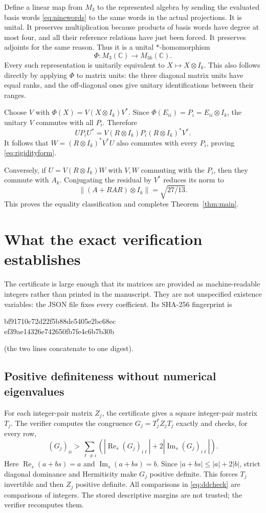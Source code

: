 \documentclass[11pt]{article}
\theoremstyle{definition}\newtheorem{definition}[theorem]{Definition}
\theoremstyle{remark}\newtheorem{remark}[theorem]{Remark}
\newcommand{\C}{\mathbb C}
\newcommand{\norm}[1]{\left\lVert#1\right\rVert}
\begin{document}
Define a linear map from $M_3$ to the represented algebra by sending the evaluated basis words \eqref{eq:ninewords} to the same words in the actual projections. It is unital. It preserves multiplication because products of basis words have degree at most four, and all their reference relations have just been forced. It preserves adjoints for the same reason. Thus it is a unital $*$-homomorphism
\[
 \Phi:M_3(\C)\longrightarrow M_{3k}(\C).
\]
Every such representation is unitarily equivalent to $X\mapsto X\otimes I_k$. This also follows directly by applying $\Phi$ to matrix units: the three diagonal matrix units have equal ranks, and the off-diagonal ones give unitary identifications between their ranges.

Choose $V$ with $\Phi(X)=V(X\otimes I_k)V^*$. Since $\Phi(E_{ii})=P_i=E_{ii}\otimes I_k$, the unitary $V$ commutes with all $P_i$. Therefore
\[
 UP_iU^*=V(R\otimes I_k)P_i(R\otimes I_k)^*V^*.
\]
It follows that $W=(R\otimes I_k)^*V^*U$ also commutes with every $P_i$, proving \eqref{eq:rigidityform}.

Conversely, if $U=V(R\otimes I_k)W$ with $V,W$ commuting with the $P_i$, then they commute with $A_k$. Conjugating the residual by $V^*$ reduces its norm to
\[
 \norm{(A+RAR)\otimes I_k}=\sqrt{27/13}.
\]
This proves the equality classification and completes Theorem~\ref{thm:main}.

\section{What the exact verification establishes}\label{sec:verification}
The certificate is large enough that its matrices are provided as machine-readable integers rather than printed in the manuscript. They are not unspecified existence variables: the JSON file fixes every coefficient. Its SHA-256 fingerprint is
\begin{center}\small\ttfamily
bf91710c72d22f5b88de5405e2bc68ec\\
ef39ae14326e742650fb7fe4c6b7b30b
\end{center}
(the two lines concatenate to one digest).

\subsection{Positive definiteness without numerical eigenvalues}
For each integer-pair matrix $Z_j$, the certificate gives a square integer-pair matrix $T_j$. The verifier computes the congruence $G_j=T_j^*Z_jT_j$ exactly and checks, for every row,
\begin{equation}\label{eq:ddcheck}
 (G_j)_{ii}>\sum_{\ell\ne i}
 \left(\left|\operatorname{Re}_s(G_j)_{i\ell}\right|
       +2\left|\operatorname{Im}_s(G_j)_{i\ell}\right|\right).
\end{equation}
Here $\operatorname{Re}_s(a+bs)=a$ and $\operatorname{Im}_s(a+bs)=b$. Since $|a+bs|\le |a|+2|b|$, strict diagonal dominance and Hermiticity make $G_j$ positive definite. This forces $T_j$ invertible and then $Z_j$ positive definite. All comparisons in \eqref{eq:ddcheck} are comparisons of integers. The stored descriptive margins are not trusted; the verifier recomputes them.
\end{document}
